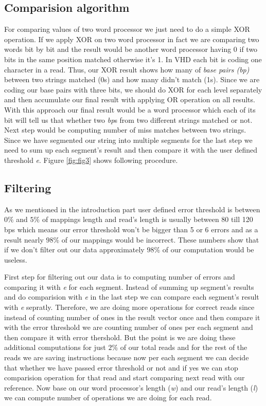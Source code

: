 \subsection{Comparision algorithm}
For comparing values of two word processor we just need to do a simple XOR operation. If we apply XOR on two word processor in fact we are comparing two words bit by bit and the result would be another word processor having 0 if two bits in the same position matched otherwise it's 1. In VHD each bit is coding one character in a read. Thus, our XOR result shows how many of \emph{base pairs (bp)} between two strings matched (0s) and how many didn't match (1s).
Since we are coding our base pairs with three bits, we should do XOR for each level separately and then accumulate our final result with applying OR operation  on all results. With this approach our final result would be a word processor which each of its bit will tell us that whether two \textit{bp}s from two different strings matched or not. Next step would be computing number of miss matches between two strings. Since we have segmented our string into multiple segments for the last step we need to sum up each segment's result and then compare it with the user defined threshold \textit{e}. Figure \ref{fig:fig3} shows following procedure.
  
\begin{figure}
\end{figure}

\subsection{Filtering}
As we mentioned in the introduction part user defined error threshold is between $0\%$ and $5\%$ of mappings length and read's length is usually between 80 till 120 bps which means our error threshold won't be bigger than 5 or 6 errors and as a result nearly $98\%$ of our mappings would be incorrect. These numbers show that if we don't filter out our data approximately $98\%$ of our computation would be useless. 

First step for filtering out our data is to computing number of errors and comparing it with \emph{e} for each segment. Instead of summing up segment's results and do comparision with \emph{e} in the last step we can compare each segment's result with \emph{e} sepratly. Therefore, we are doing more operations for correct reads since instead of counting number of ones in the result vector once and then compare it with the error threshold we are counting number of ones per each segment and then compare it with error thershold.  But the point is we are doing these additional computations for just $2\%$ of our total reads and for the rest of the reads we are saving instructions because now per each segment we can decide that whether we have passed error threshold or not and if yes we can stop comparision operation for that read and start comparing next read with our reference. Now base on our word processor's length (\emph{w}) and our read's length (\emph{l}) we can compute number of operations we are doing for each read.

